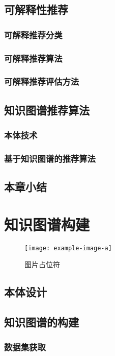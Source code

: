 \section{可解释性推荐}


\subsection{可解释推荐分类}


\subsection{可解释推荐算法}


\subsection{可解释推荐评估方法}

\section{知识图谱推荐算法}
\subsection{本体技术}
\subsection{基于知识图谱的推荐算法}

\section{本章小结}

\chapter{知识图谱构建}
\begin{figure}[htbp]
    \centering
    \texttt{[image: example-image-a]}
    \caption{\label{fig:fig-placeholder}图片占位符}
\end{figure}
\section{本体设计}
\section{知识图谱的构建}
\subsection{数据集获取}

